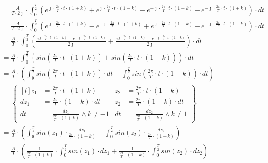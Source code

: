 \begin{align*}
&=\frac{A}{T\cdot 2\jmath} \cdot \int_{0}^{\frac{T}{2}}
\left(e^{\jmath \cdot \frac{2\pi}{T} \cdot t \cdot \left(1+k\right)} + e^{\jmath \cdot \frac{2\pi}{T} \cdot t \cdot \left(1 - k\right)} - e^{-\jmath \cdot \frac{2\pi}{T} \cdot t \cdot \left(1 -k\right)} - e^{-\jmath \cdot \frac{2\pi}{T} \cdot t \cdot \left(1+k\right)} \right) \cdot dt\\
&=\frac{A}{T\cdot 2\jmath} \cdot \int_{0}^{\frac{T}{2}}
\left(e^{\jmath \cdot \frac{2\pi}{T} \cdot t \cdot \left(1+k\right)} - e^{-\jmath \cdot \frac{2\pi}{T} \cdot t \cdot \left(1+k\right)} + e^{\jmath \cdot \frac{2\pi}{T} \cdot t \cdot \left(1 - k\right)} - e^{-\jmath \cdot \frac{2\pi}{T} \cdot t \cdot \left(1 -k\right)} \right) \cdot dt\\
&=\frac{A}{T} \cdot \int_{0}^{\frac{T}{2}}
\left( \frac{e^{\jmath \cdot \frac{2\pi}{T} \cdot t \cdot \left(1+k\right)} - e^{-\jmath \cdot \frac{2\pi}{T} \cdot t \cdot \left(1+k\right)}}{2\jmath} + \frac{e^{\jmath \cdot \frac{2\pi}{T} \cdot t \cdot \left(1 - k\right)} - e^{-\jmath \cdot \frac{2\pi}{T} \cdot t \cdot \left(1 -k\right)}}{2\jmath} \right) \cdot dt\\
&=\frac{A}{T} \cdot \int_{0}^{\frac{T}{2}}
\left( sin\left( \frac{2\pi}{T} \cdot t \cdot \left(1+k\right) \right) + sin\left( \frac{2\pi}{T} \cdot t \cdot \left(1 - k\right)\right) \right) \cdot dt\\
&=\frac{A}{T} \cdot \left( \int_{0}^{\frac{T}{2}}
 sin\left( \frac{2\pi}{T} \cdot t \cdot \left(1+k\right) \right) \cdot dt + \int_{0}^{\frac{T}{2}} sin\left( \frac{2\pi}{T} \cdot t \cdot \left(1 - k\right)\right) \cdot dt \right)\\
&=\begin{Bmatrix*}[l]
z_1&=\frac{2\pi}{T} \cdot t \cdot \left(1+k\right) & z_2&=\frac{2\pi}{T} \cdot t \cdot \left(1-k\right)\\
dz_1&=\frac{2\pi}{T} \cdot \left(1+k\right) \cdot dt & z_2&=\frac{2\pi}{T} \cdot \left(1-k\right) \cdot dt\\
dt&=\frac{dz_1}{\frac{2\pi}{T} \cdot \left(1+k\right)} \wedge k \neq -1& dt&=\frac{dz_2}{\frac{2\pi}{T} \cdot \left(1-k\right)} \wedge k \neq 1
\end{Bmatrix*}\\
&=\frac{A}{T} \cdot \left(\int_{0}^{\frac{T}{2}} sin\left( z_1 \right)\cdot \frac{dz_1}{\frac{2\pi}{T} \cdot \left(1+k\right)}  + \int_{0}^{\frac{T}{2}} sin\left( z_2\right) \cdot \frac{dz_2}{\frac{2\pi}{T} \cdot \left(1-k\right)}\right)\\
&=\frac{A}{T} \cdot \left(\frac{1}{\frac{2\pi}{T}\cdot \left(1+k\right)} \cdot \int_{0}^{\frac{T}{2}} sin\left( z_1 \right)\cdot dz_1 + \frac{1}{\frac{2\pi}{T} \cdot \left(1-k\right)} \cdot \int_{0}^{\frac{T}{2}} sin\left( z_2\right) \cdot dz_2 \right)\\

\end{align*}
